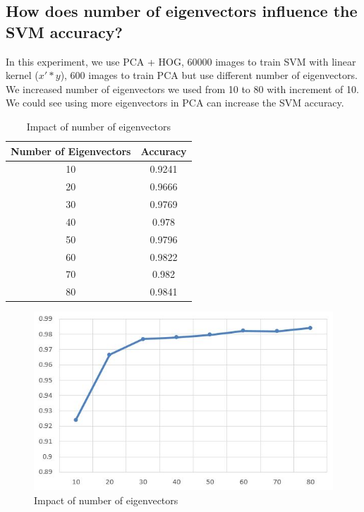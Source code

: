 \documentclass[10pt,twocolumn,letterpaper]{article}
\begin{document}
\subsection{How does number of eigenvectors influence the SVM accuracy?}
In this experiment, we use PCA + HOG, 60000 images to train SVM with linear kernel ($x' * y$), 600 images to train PCA but use different number of eigenvectors. We increased number of eigenvectors we used from 10 to 80 with increment of 10. We could see using more eigenvectors in PCA can increase the SVM accuracy.

\begin{table}
    \begin{center}
    \begin{tabular}{|c|c|}
      \hline
      Number of Eigenvectors & Accuracy \\
      \hline
        10 & 0.9241\\
        20 & 0.9666\\
        30 & 0.9769\\
        40 & 0.978 \\
        50 & 0.9796\\
        60 & 0.9822\\
        70 & 0.982 \\
        80 & 0.9841\\
      \hline
    \end{tabular}
    \end{center}
    \caption{Impact of number of eigenvectors}
    \label{t3}
\end{table}

\begin{figure}
  \includegraphics[width=0.95\linewidth]{f2.JPG}
  \caption{Impact of number of eigenvectors}
  \label{f2}
\end{figure}
\end{document}
